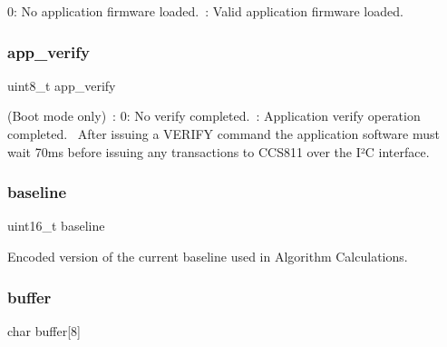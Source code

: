0\+: No application firmware loaded.~\+: Valid application firmware loaded. 

\mbox{\label{union_application_register_adce608653e619b089b54d75eed8bf6ed}} 
\subsubsection{\texorpdfstring{app\+\_\+verify}{app\_verify}}
{\footnotesize\ttfamily uint8\+\_\+t app\+\_\+verify}



(Boot mode only)~\+: 0\+: No verify completed.~\+: Application verify operation completed.~\newline
 After issuing a V\+E\+R\+I\+FY command the application software must wait 70ms before issuing any transactions to C\+C\+S811 over the I²C interface. 

\mbox{\label{union_application_register_ae5b7baf8a03c8658a511369ee726b08a}} 
\subsubsection{\texorpdfstring{baseline}{baseline}}
{\footnotesize\ttfamily uint16\+\_\+t baseline}



Encoded version of the current baseline used in Algorithm Calculations. 

\mbox{\label{union_application_register_a4935b1dbe41ddae16157f83bd161c550}} 
\subsubsection{\texorpdfstring{buffer}{buffer}}
{\footnotesize\ttfamily char buffer\mbox{[}8\mbox{]}}



